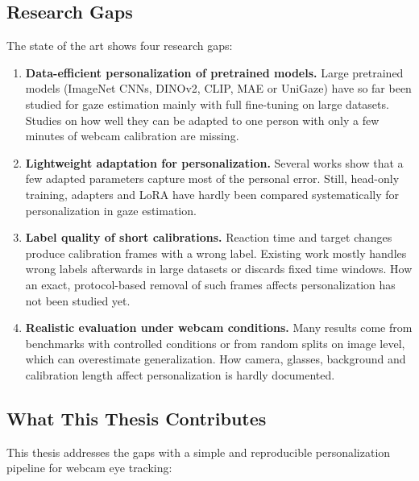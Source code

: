 \subsection{Research Gaps}
\label{subsec:luecken}
The state of the art shows four research gaps:

\begin{enumerate}[label=\textbf{G\arabic*:}, leftmargin=*, align=left]
  \item \textbf{Data-efficient personalization of pretrained models.}
  Large pretrained models (ImageNet CNNs, DINOv2, CLIP, MAE or UniGaze) have so
  far been studied for gaze estimation mainly with full fine-tuning on large
  datasets. Studies on how well they can be adapted to one person with only a
  few minutes of webcam calibration are missing.

  \item \textbf{Lightweight adaptation for personalization.}
  Several works show that a few adapted parameters capture most of the personal
  error. Still, head-only training, adapters and LoRA have hardly been compared
  systematically for personalization in gaze estimation.

  \item \textbf{Label quality of short calibrations.}
  Reaction time and target changes produce calibration frames with a wrong
  label. Existing work mostly handles wrong labels afterwards in large datasets
  or discards fixed time windows. How an exact, protocol-based removal of such
  frames affects personalization has not been studied yet.

  \item \textbf{Realistic evaluation under webcam conditions.}
  Many results come from benchmarks with controlled conditions or from random
  splits on image level, which can overestimate generalization. How camera,
  glasses, background and calibration length affect personalization is
  hardly documented.
\end{enumerate}

\subsection{What This Thesis Contributes}
\label{subsec:ueberleitung}
This thesis addresses the gaps with a simple and reproducible personalization
pipeline for webcam eye tracking:

